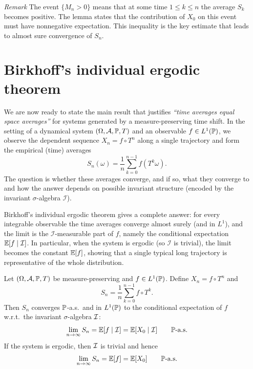 \noindent
\emph{Remark}
The event \(\{M_n>0\}\) means that at some time \(1\le k\le n\) the average \(S_k\) becomes positive.
The lemma states that the contribution of \(X_0\) on this event must have nonnegative expectation.
This inequality is the key estimate that leads to almost sure convergence of \(S_n\).

\section{Birkhoff's individual ergodic theorem}

We are now ready to state the main result that justifies \emph{``time averages equal space averages''}
for systems generated by a measure-preserving time shift. In the setting of a dynamical system
$(\Omega,\mathcal A,\mathbb{P},T)$ and an observable $f\in L^1(\mathbb{P})$, we observe the dependent sequence
$X_n=f\circ T^n$ along a single trajectory and form the empirical (time) averages
\[
S_n(\omega)=\frac1n\sum_{k=0}^{n-1} f(T^k\omega).
\]
The question is whether these averages converge, and if so, what they converge to and how the answer depends on
possible invariant structure (encoded by the invariant $\sigma$-algebra $\mathcal I$).

\medskip
Birkhoff's individual ergodic theorem gives a complete answer: for every integrable observable the time averages
converge almost surely (and in $L^1$), and the limit is the $\mathcal I$-measurable part of $f$, namely
the conditional expectation $\mathbb{E}[f\mid\mathcal I]$. In particular, when the system is ergodic (so $\mathcal I$ is trivial),
the limit becomes the constant $\mathbb{E}[f]$, showing that a single typical long trajectory is representative of the whole
distribution.


\begin{theorem}
Let \((\Omega,\mathcal{A},\mathbb{P},T)\) be measure-preserving and \(f\in L^1(\mathbb{P})\). Define \(X_n=f\circ T^n\) and
\[
S_n=\frac1n\sum_{k=0}^{n-1}f\circ T^k.
\]
Then \(S_n\) converges \(\mathbb{P}\)-a.s.\ and in \(L^1(\mathbb{P})\) to the conditional expectation of \(f\) w.r.t.\ the invariant \(\sigma\)-algebra \(\mathcal{I}\):
\[
\lim_{n\to\infty} S_n
= \mathbb{E}[f \mid \mathcal{I}]
= \mathbb{E}[X_0 \mid \mathcal{I}]
\qquad \mathbb{P}\text{-a.s.}
\]
If the system is ergodic, then \(\mathcal{I}\) is trivial and hence
\[
\lim_{n\to\infty} S_n = \mathbb{E}[f] = \mathbb{E}[X_0]
\qquad \mathbb{P}\text{-a.s.}
\]
\end{theorem}

